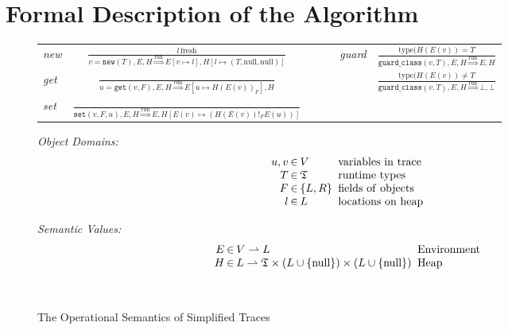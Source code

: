 \documentclass{sigplanconf}
\begin{document}
\section{Formal Description of the Algorithm}
\label{sec:formal}


\begin{figure}
\begin{center}
\begin{tabular}{lcccc}
\emph{new} & ${\displaystyle \frac{l\,\mathrm{fresh}}{v=\mathtt{new}(T),E,H\overset{\mathrm{run}}{\Longrightarrow}E\left[v\mapsto l\right],H\left[l\mapsto\left(T,\mathrm{null},\mathrm{null}\right)\right]}}$ & ~~~ & \emph{guard} & ${\displaystyle \frac{\mathrm{type}(H(E(v))=T}{\mathtt{guard\_class}(v,T),E,H\overset{\mathrm{run}}{\Longrightarrow}E,H}}$\tabularnewline[3em]
\emph{get} & ${\displaystyle \frac{\,}{u=\mathtt{get}(v,F),E,H\overset{\mathrm{run}}{\Longrightarrow}E\left[u\mapsto H\left(E\left(v\right)\right)_{F}\right],H}}$ & ~~~ &  & ${\displaystyle \frac{\mathrm{type}(H(E(v))\neq T}{\mathtt{guard\_class}(v,T),E,H\overset{\mathrm{run}}{\Longrightarrow}\bot,\bot}}$\tabularnewline[3em]
\emph{set} & ${\displaystyle \frac{\,}{\mathtt{set}\left(v,F,u\right),E,H\overset{\mathrm{run}}{\Longrightarrow}E,H\left[E\left(v\right)\mapsto\left(H\left(E\left(v\right)\right)!_{F}E(u)\right)\right]}}$ & ~~~ &  & \tabularnewline[4em]
\end{tabular}

\begin{minipage}[b]{7 cm}
\emph{Object Domains:}
$$\setlength\arraycolsep{0.1em}
 \begin{array}{rcll}
    u,v & \in & V & \mathrm{\ variables\ in\ trace}\\
    T & \in & \mathfrak{T} & \mathrm{\ runtime\ types}\\
    F & \in & \left\{ L,R\right\} & \mathrm{\ fields\ of\ objects}\\
    l & \in & L & \mathrm{\ locations\ on\ heap}
 \end{array}
$$
\end{minipage}
\begin{minipage}[b]{5 cm}
\emph{Semantic Values:}
$$\setlength\arraycolsep{0.1em}
 \begin{array}{rcll}
    E & \in & V\rightharpoonup L & \mathrm{\ Environment}\\
    H & \in & L\rightharpoonup\mathfrak{T}\times(L\cup \{ \mathrm{null} \})\times (L\cup \{ \mathrm{null}\} ) & \mathrm{\ Heap}\\
    \\
    \\
 \end{array}
$$
\end{minipage}
\end{center}
\caption{The Operational Semantics of Simplified Traces}
\label{fig:semantics}
\end{figure}
\end{document}
